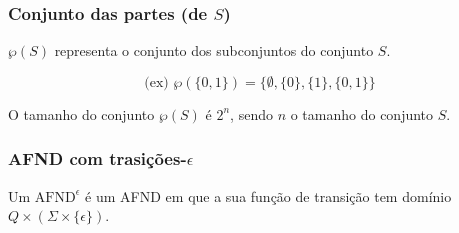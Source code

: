\documentclass{article}
\begin{document}
\subsubsection{Conjunto das partes (de $S$)}

$\wp(S)$ representa o conjunto dos subconjuntos do conjunto $S$.

$$ \text{(ex) } \wp(\{0,1\}) = \{\emptyset, \{0\}, \{1\}, \{0,1\}\} $$

\noindent O tamanho do conjunto $\wp(S)$ é $2^n$, sendo $n$ o tamanho do conjunto $S$.

\subsubsection{AFND com trasições-$\epsilon$}

Um $\text{AFND}^\epsilon$ é um AFND em que a sua função de transição tem domínio $Q \times (\Sigma \times \{\epsilon\})$.
\end{document}
